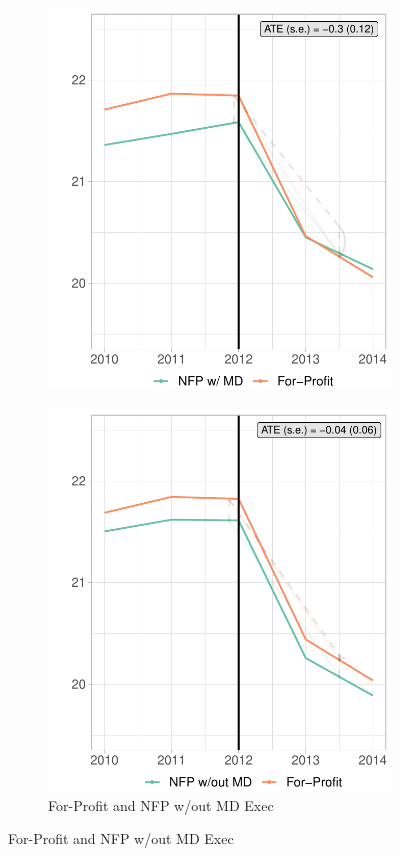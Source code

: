\documentclass[12pt]{article}
\begin{document}
\begin{figure}
\begin{subfigure}[b]{0.45\textwidth}
         \includegraphics[width=\textwidth]{Objects/read_fp_md_synth_graph.pdf}
         \label{fig:read_synth_plotb}
     \end{subfigure}%
     \vspace{5mm}
     \hfill
     \begin{subfigure}[b]{0.45\textwidth}
         \centering
         \caption{For-Profit and NFP w/out MD Exec}
         \includegraphics[width=\textwidth]{Objects/read_fp_nomd_synth_graph.pdf}

\end{subfigure}
\end{figure}
\end{document}
